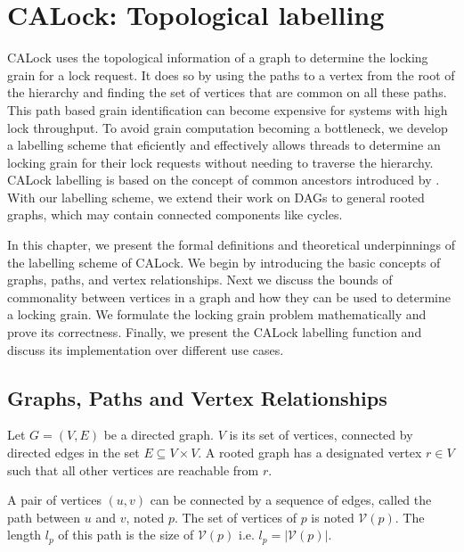 

\chapter{CALock: Topological labelling} \label{chap:theory}
\minitoc
CALock uses the topological information of a graph to determine the locking grain for a lock request. It does so by using the paths to a vertex from the root of the hierarchy and finding the set of vertices that are common on all these paths. This path based grain identification can become expensive for systems with high lock throughput. To avoid grain computation becoming a bottleneck, we develop a labelling scheme that eficiently and effectively allows threads to determine an locking grain for their lock requests without needing to traverse the hierarchy. CALock labelling is based on the concept of common ancestors introduced by \citet{fischer2010new}. With our labelling scheme, we extend their work on DAGs to general rooted graphs, which may contain connected components like cycles. 


In this chapter, we present the formal definitions and theoretical underpinnings of the labelling scheme of CALock.
We begin by introducing the basic concepts of graphs, paths, and vertex relationships.
Next we discuss the bounds of commonality between vertices in a graph and how they can be used to determine a locking grain. We formulate the locking grain problem mathematically and prove its correctness. Finally, we present the CALock labelling function and discuss its implementation over different use cases.

\section{Graphs, Paths and Vertex Relationships}


Let $G=(V, E)$ be a directed graph. $V$ is its set of vertices, connected by directed edges in the set $E \subseteq V \times V$.  A rooted graph has a designated vertex $r \in V$ such that all other vertices are reachable from $r$.

A pair of vertices $(u, v)$ can be connected by a sequence of edges, called the path between $u$ and $v$, noted $p$. The set of vertices of $p$ is noted $\mathcal{V}(p)$. The length $l_p$ of this path is the size of $\mathcal{V}(p)$ i.e. $l_p = \lvert \mathcal{V}(p)\rvert$.

